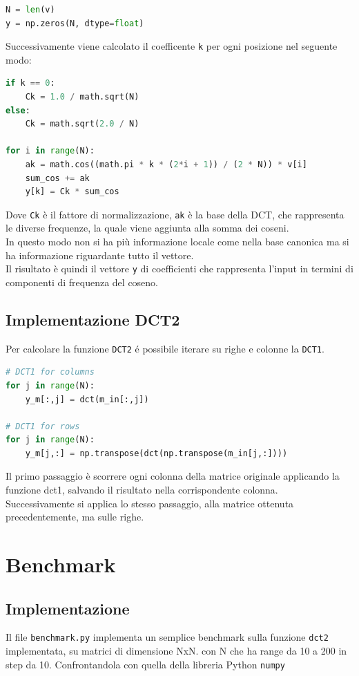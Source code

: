 \documentclass[italian]{article}
\begin{document}
\begin{lstlisting}[language=Python]
N = len(v)
y = np.zeros(N, dtype=float)
\end{lstlisting}

Successivamente viene calcolato il coefficente \texttt{k} per ogni posizione nel seguente modo:


\begin{lstlisting}[language=Python]
if k == 0:
	Ck = 1.0 / math.sqrt(N)
else:
	Ck = math.sqrt(2.0 / N)
	
for i in range(N):
	ak = math.cos((math.pi * k * (2*i + 1)) / (2 * N)) * v[i]
	sum_cos += ak
	y[k] = Ck * sum_cos
\end{lstlisting}

Dove \texttt{Ck} \`e il fattore di normalizzazione, \texttt{ak} \`e la base della DCT, che rappresenta le diverse frequenze, la quale viene aggiunta alla somma dei coseni.\\
In questo modo non si ha pi\`u informazione locale come nella base canonica ma si ha informazione riguardante tutto il vettore.\\
Il risultato \`e quindi il vettore \texttt{y} di coefficienti che rappresenta l'input in termini di componenti di frequenza del coseno.

\subsection{Implementazione DCT2}
Per calcolare la funzione \texttt{DCT2} \'e possibile iterare su righe e colonne la \texttt{DCT1}.\\

\begin{lstlisting}[language=Python]
# DCT1 for columns
for j in range(N):
	y_m[:,j] = dct(m_in[:,j])

# DCT1 for rows
for j in range(N):
	y_m[j,:] = np.transpose(dct(np.transpose(m_in[j,:])))
\end{lstlisting}

Il primo passaggio \`e scorrere ogni colonna della matrice originale applicando la funzione dct1, salvando il risultato nella corrispondente colonna.\\
Successivamente si applica lo stesso passaggio, alla matrice ottenuta precedentemente, ma sulle righe.

\section{Benchmark}
\subsection{Implementazione}
Il file \texttt{benchmark.py} implementa un semplice benchmark sulla funzione \texttt{dct2} implementata, su matrici di dimensione NxN. con N che ha range da 10 a 200 in step da 10. Confrontandola con quella della libreria Python \texttt{numpy}
\end{document}
